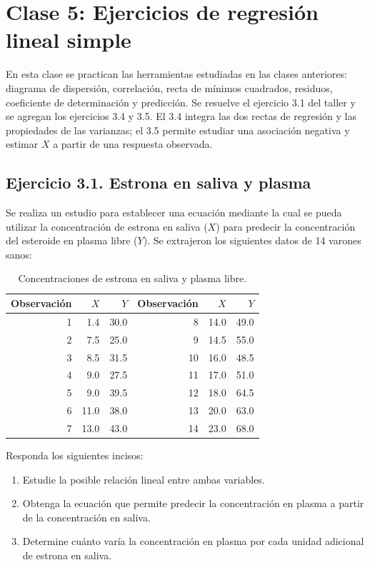 \chapter{Clase 5: Ejercicios de regresión lineal simple}

En esta clase se practican las herramientas estudiadas en las clases anteriores: diagrama de dispersión, correlación, recta de mínimos cuadrados, residuos, coeficiente de determinación y predicción. Se resuelve el ejercicio 3.1 del taller y se agregan los ejercicios 3.4 y 3.5. El 3.4 integra las dos rectas de regresión y las propiedades de las varianzas; el 3.5 permite estudiar una asociación negativa y estimar $X$ a partir de una respuesta observada.

\section{Ejercicio 3.1. Estrona en saliva y plasma}

Se realiza un estudio para establecer una ecuación mediante la cual se pueda utilizar la concentración de estrona en saliva ($X$) para predecir la concentración del esteroide en plasma libre ($Y$). Se extrajeron los siguientes datos de 14 varones sanos:

\begin{table}[H]
\centering
\small
\begin{tabular}{r|rr@{\qquad}r|rr}
Observación & $X$ & $Y$ & Observación & $X$ & $Y$ \\ \hline
1 & 1.4 & 30.0 & 8 & 14.0 & 49.0 \\
2 & 7.5 & 25.0 & 9 & 14.5 & 55.0 \\
3 & 8.5 & 31.5 & 10 & 16.0 & 48.5 \\
4 & 9.0 & 27.5 & 11 & 17.0 & 51.0 \\
5 & 9.0 & 39.5 & 12 & 18.0 & 64.5 \\
6 & 11.0 & 38.0 & 13 & 20.0 & 63.0 \\
7 & 13.0 & 43.0 & 14 & 23.0 & 68.0 \\
\end{tabular}
\caption{Concentraciones de estrona en saliva y plasma libre.}
\label{tab:clase5-estrona-datos}
\end{table}

Responda los siguientes incisos:
\begin{enumerate}
    \item[\textbf{a)}] Estudie la posible relación lineal entre ambas variables.
    \item[\textbf{b)}] Obtenga la ecuación que permite predecir la concentración en plasma a partir de la concentración en saliva.
    \item[\textbf{c)}] Determine cuánto varía la concentración en plasma por cada unidad adicional de estrona en saliva.
\end{enumerate}

